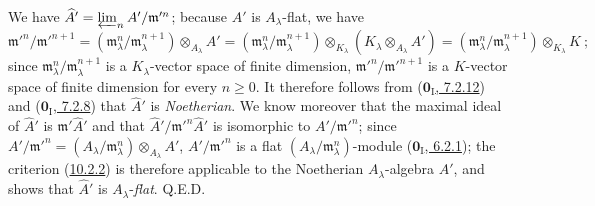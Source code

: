 We have $\widehat A'=\varprojlim_n A'/\mathfrak m'^{n}$; because
$A'$ is $A_\lambda$-flat, we have
\[
  \mathfrak m'^{n}/\mathfrak m'^{n+1}
  =(\mathfrak m_\lambda^n/\mathfrak m_\lambda^{n+1})
    \otimes_{A_\lambda}A'
  =(\mathfrak m_\lambda^n/\mathfrak m_\lambda^{n+1})
    \otimes_{K_\lambda}(K_\lambda\otimes_{A_\lambda}A')
  =(\mathfrak m_\lambda^n/\mathfrak m_\lambda^{n+1})
    \otimes_{K_\lambda}K~;
\]
since $\mathfrak m_\lambda^n/\mathfrak m_\lambda^{n+1}$ is a
$K_\lambda$-vector space of finite dimension,
$\mathfrak m'^{n}/\mathfrak m'^{n+1}$ is a $K$-vector space of finite
dimension for every $n\geq0$. It therefore follows from
(\hyperref[0.7.2.12]{$\mathbf{0}_{\mathrm I}$, 7.2.12}) and
(\hyperref[0.7.2.8]{$\mathbf{0}_{\mathrm I}$, 7.2.8}) that $\widehat A'$ is
\emph{Noetherian}. We know moreover that the maximal ideal of $\widehat A'$ is
$\mathfrak m'\widehat A'$ and that
$\widehat A'/\mathfrak m'^{n}\widehat A'$ is isomorphic to
$A'/\mathfrak m'^{n}$; since
$A'/\mathfrak m'^{n}=(A_\lambda/\mathfrak m_\lambda^n)
\otimes_{A_\lambda}A'$, $A'/\mathfrak m'^{n}$ is a flat
$(A_\lambda/\mathfrak m_\lambda^n)$-module
(\hyperref[0.6.2.1]{$\mathbf{0}_{\mathrm I}$, 6.2.1}); the criterion
(\hyperref[0.10.2.2]{10.2.2}) is therefore applicable to the Noetherian
$A_\lambda$-algebra $\widehat A'$, and shows that $\widehat A'$
is $A_\lambda$-\emph{flat}. Q.E.D.

